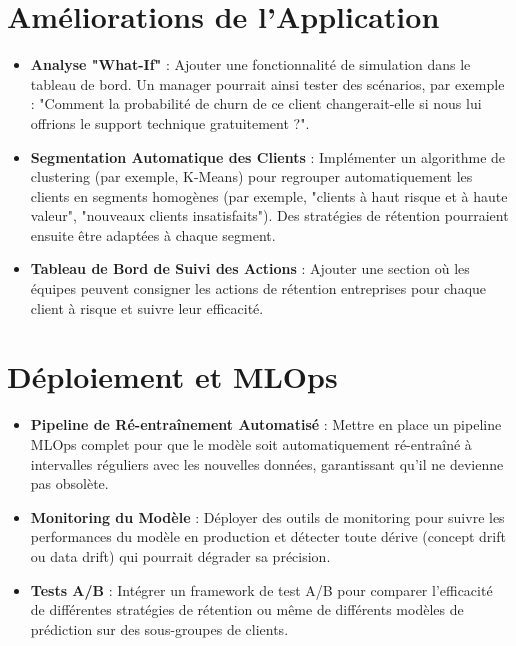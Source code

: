 \section{Améliorations de l'Application}
\begin{itemize}
    \item \textbf{Analyse "What-If"} : Ajouter une fonctionnalité de simulation dans le tableau de bord. Un manager pourrait ainsi tester des scénarios, par exemple : "Comment la probabilité de churn de ce client changerait-elle si nous lui offrions le support technique gratuitement ?".
    \item \textbf{Segmentation Automatique des Clients} : Implémenter un algorithme de clustering (par exemple, K-Means) pour regrouper automatiquement les clients en segments homogènes (par exemple, "clients à haut risque et à haute valeur", "nouveaux clients insatisfaits"). Des stratégies de rétention pourraient ensuite être adaptées à chaque segment.
    \item \textbf{Tableau de Bord de Suivi des Actions} : Ajouter une section où les équipes peuvent consigner les actions de rétention entreprises pour chaque client à risque et suivre leur efficacité.
\end{itemize}

\section{Déploiement et MLOps}
\begin{itemize}
    \item \textbf{Pipeline de Ré-entraînement Automatisé} : Mettre en place un pipeline MLOps complet pour que le modèle soit automatiquement ré-entraîné à intervalles réguliers avec les nouvelles données, garantissant qu'il ne devienne pas obsolète.
    \item \textbf{Monitoring du Modèle} : Déployer des outils de monitoring pour suivre les performances du modèle en production et détecter toute dérive (concept drift ou data drift) qui pourrait dégrader sa précision.
    \item \textbf{Tests A/B} : Intégrer un framework de test A/B pour comparer l'efficacité de différentes stratégies de rétention ou même de différents modèles de prédiction sur des sous-groupes de clients.
\end{itemize}
